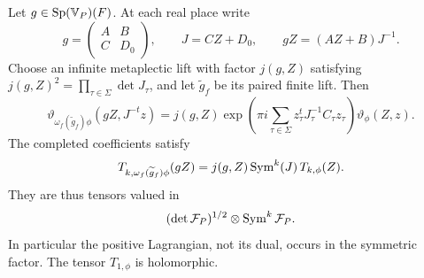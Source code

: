 \begin{lemma}\label{lem:theta-tensor-law}
Let \(g\in\operatorname{Sp}(\mathbb V_P)(F)\).  At each real place write
\[
 g=\begin{pmatrix}A&B\\C&D_0\end{pmatrix},\qquad
 J=CZ+D_0,\qquad gZ=(AZ+B)J^{-1}.
\]
Choose an infinite metaplectic lift with factor \(j(g,Z)\) satisfying
\(j(g,Z)^2=\prod_{\tau\in\Sigma}\det J_\tau\), and let
\(\widetilde g_f\) be its paired finite lift.  Then
\begin{equation}\label{eq:theta-jacobi-law}
 \vartheta_{\omega_f(\widetilde g_f)\phi}(gZ,J^{-t}z)
  =j(g,Z)\exp\!\left(\pi i\sum_{\tau\in\Sigma}
             z_\tau^tJ_\tau^{-1}C_\tau z_\tau\right)
             \vartheta_\phi(Z,z).
\end{equation}
The completed coefficients satisfy
\begin{equation}\label{eq:theta-taylor-law}
 T_{k,\omega_f(\widetilde g_f)\phi}(gZ)
   =j(g,Z)\operatorname{Sym}^k(J)\,T_{k,\phi}(Z).
\end{equation}
They are thus tensors valued in
\[
 (\det\mathcal F_P)^{1/2}\otimes\operatorname{Sym}^k\mathcal F_P.
\]
In particular the positive Lagrangian, not its dual, occurs in
the symmetric factor.  The tensor \(T_{1,\phi}\) is holomorphic.
\end{lemma}

